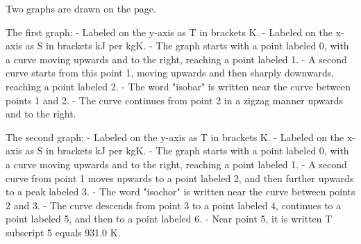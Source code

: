 Two graphs are drawn on the page.

The first graph:
- Labeled on the y-axis as T in brackets K.
- Labeled on the x-axis as S in brackets kJ per kgK.
- The graph starts with a point labeled 0, with a curve moving upwards and to the right, reaching a point labeled 1. 
- A second curve starts from this point 1, moving upwards and then sharply downwards, reaching a point labeled 2.
- The word "isobar" is written near the curve between points 1 and 2.
- The curve continues from point 2 in a zigzag manner upwards and to the right.

The second graph:
- Labeled on the y-axis as T in brackets K.
- Labeled on the x-axis as S in brackets kJ per kgK.
- The graph starts with a point labeled 0, with a curve moving upwards and to the right, reaching a point labeled 1. 
- A second curve from point 1 moves upwards to a point labeled 2, and then further upwards to a peak labeled 3.
- The word "isochor" is written near the curve between points 2 and 3.
- The curve descends from point 3 to a point labeled 4, continues to a point labeled 5, and then to a point labeled 6.
- Near point 5, it is written T subscript 5 equals 931.0 K.